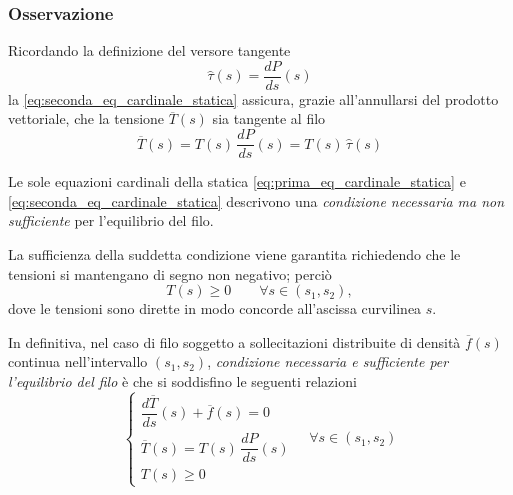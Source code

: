 \subsubsection*{Osservazione}
Ricordando la definizione del versore tangente
\[
\hat{\tau}(s) = \dfrac{dP}{ds}(s)
\]
la \eqref{eq:seconda_eq_cardinale_statica} assicura, grazie all'annullarsi del prodotto vettoriale, che la tensione $\overline{T}(s)$ sia tangente al filo
\[
\overline{T}(s) = T(s)\,\dfrac{dP}{ds}(s) = T(s)\,\hat{\tau}(s)
\]

Le sole equazioni cardinali della statica \eqref{eq:prima_eq_cardinale_statica} e \eqref{eq:seconda_eq_cardinale_statica} descrivono una \emph{condizione necessaria ma non sufficiente} per l'equilibrio del filo.

La sufficienza della suddetta condizione viene garantita richiedendo che le tensioni si mantengano di segno non negativo; perciò
\[
T(s)\geq 0\qquad \forall s\in(s_1, s_2),
\]
dove le tensioni sono dirette in modo concorde all'ascissa curvilinea $s$.

In definitiva, nel caso di filo soggetto a sollecitazioni distribuite di densità $\overline{f}(s)$ continua nell'intervallo $(s_1, s_2)$, \emph{condizione necessaria e sufficiente per l'equilibrio del filo} è che si soddisfino le seguenti relazioni
\begin{equation}
	\label{eq:cns_equilibrio}
	\begin{cases}
		\dfrac{d\overline{T}}{ds}(s) + \overline{f}(s) = 0\\
		\overline{T}(s) = T(s)\,\dfrac{dP}{ds}(s)\\
		T(s) \geq 0
	\end{cases}
	\quad \forall s \in(s_1, s_2)
\end{equation}

